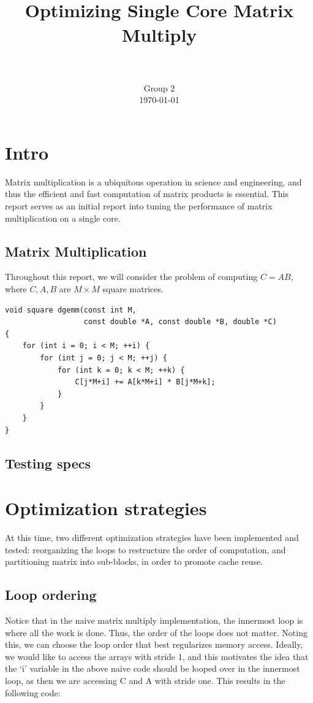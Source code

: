 \documentclass[fontsize=11pt]{scrartcl}
\title{
        \usefont{OT1}{bch}{b}{n}
        \horrule{0.5pt} \\[0.4cm]
        \huge Optimizing Single Core Matrix Multiply \\
        \horrule{2pt} \\[0.5cm]
}
\author{
        \normalfont                                 \normalsize
        Group 2\\[-3pt]      \normalsize
        \today
}
\date{}
\numberwithin{equation}{section}        %
\numberwithin{figure}{section}          %
\numberwithin{table}{section}               %
\begin{document}
\maketitle

\section{Intro}
Matrix multiplication is a ubiquitous operation in science and engineering,
and thus the efficient and fast computation of matrix products is essential.
This report serves as an initial report into tuning the performance of matrix
multiplication on a single core.

\subsection{Matrix Multiplication}
Throughout this report, we will consider the problem of computing
$C = A B$, where $C, A, B$ are $M \times M$ square matrices.

\begin{lstlisting}[frame = single, caption={Naive Square Matrix Multiply}]
void square dgemm(const int M, 
                  const double *A, const double *B, double *C)
{
    for (int i = 0; i < M; ++i) {
        for (int j = 0; j < M; ++j) {
            for (int k = 0; k < M; ++k) {
                C[j*M+i] += A[k*M+i] * B[j*M+k];
            }
        }
    }
}
\end{lstlisting}

\subsection{Testing specs}

\section{Optimization strategies}

At this time, two different optimization strategies have been implemented and
tested: reorganizing the loops to restructure the order of computation, and 
partitioning matrix into sub-blocks, in order to promote cache reuse.

\subsection{Loop ordering}
Notice that in the naive matrix multiply implementation, the innermost loop
is where all the work is done.  Thus, the order of the loops does not matter.
Noting this, we can choose the loop order that best regularizes memory access.
Ideally, we would like to access the arrays with stride 1, and this motivates the
idea that the `i' variable in the above naive code should be looped over in the 
innermost loop, as then we are accessing C and A with stride one.  This results in 
the following code:
\end{document}
